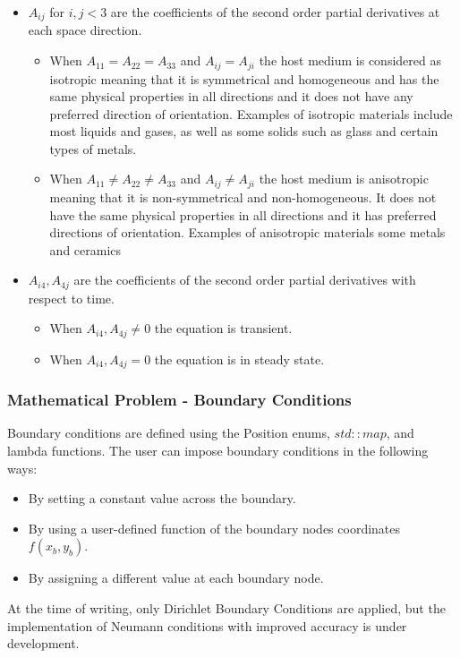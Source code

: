 \documentclass{article}
\begin{document}
	\begin{itemize}
		\item $A_{ij}$ for $i,j<3$ are the coefficients of the second order partial derivatives at each space direction. 
		
		\begin{itemize}
			\item When $A_{11}=A_{22}=A_{33}$ and $A_{ij}=A_{ji}$ the host medium is considered as isotropic meaning that it is symmetrical and homogeneous and has the same physical properties in all directions and it does not have any preferred direction of orientation. Examples of isotropic materials include most liquids and gases, as well as some solids such as glass and certain types of metals.
			
			\item When $A_{11} \neq A_{22} \neq A_{33}$ and $A_{ij}\neq A_{ji}$ the host medium is  anisotropic meaning that it is non-symmetrical and non-homogeneous. It does not have the same physical properties in all directions and it has preferred directions of orientation. Examples of anisotropic materials some metals and ceramics
		\end{itemize}
		
		\item $A_{i4},A_{4j}$ are the coefficients of the second order partial derivatives with respect to time.
		\begin{itemize}
			\item When $A_{i4},A_{4j} \neq 0$ the equation is transient. 
			\item When $A_{i4},A_{4j} = 0$ the equation is in steady state. 
		\end{itemize}
	\end{itemize}
	
	\subsubsection{Mathematical Problem - Boundary Conditions}
	Boundary conditions are defined using the Position enums, $std::map$, and lambda functions. The user can impose boundary conditions in the following ways:
	\begin{itemize}
		\item By setting a constant value across the boundary.
		\item By using a user-defined function of the boundary nodes coordinates $f(x_b, y_b)$.
		\item By assigning a different value at each boundary node.
	\end{itemize}
	At the time of writing, only Dirichlet Boundary Conditions are applied, but the implementation of Neumann conditions with improved accuracy is under development.
	
\end{document}
